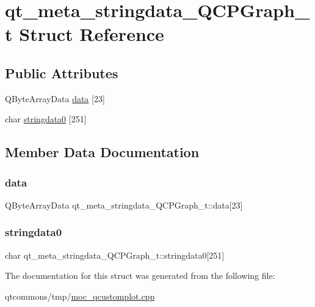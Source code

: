 \hypertarget{structqt__meta__stringdata___q_c_p_graph__t}{}\section{qt\+\_\+meta\+\_\+stringdata\+\_\+\+Q\+C\+P\+Graph\+\_\+t Struct Reference}
\label{structqt__meta__stringdata___q_c_p_graph__t}
\subsection*{Public Attributes}
\begin{DoxyCompactItemize}
\item 
Q\+Byte\+Array\+Data \mbox{\hyperlink{structqt__meta__stringdata___q_c_p_graph__t_af78bec72bfcd2280647dbc8a0f13efb4}{data}} \mbox{[}23\mbox{]}
\item 
char \mbox{\hyperlink{structqt__meta__stringdata___q_c_p_graph__t_a40cf507394e2a4d8b2cbcd563af62ad0}{stringdata0}} \mbox{[}251\mbox{]}
\end{DoxyCompactItemize}


\subsection{Member Data Documentation}
\mbox{\label{structqt__meta__stringdata___q_c_p_graph__t_af78bec72bfcd2280647dbc8a0f13efb4}} 
\subsubsection{\texorpdfstring{data}{data}}
{\footnotesize\ttfamily Q\+Byte\+Array\+Data qt\+\_\+meta\+\_\+stringdata\+\_\+\+Q\+C\+P\+Graph\+\_\+t\+::data\mbox{[}23\mbox{]}}

\mbox{\label{structqt__meta__stringdata___q_c_p_graph__t_a40cf507394e2a4d8b2cbcd563af62ad0}} 
\subsubsection{\texorpdfstring{stringdata0}{stringdata0}}
{\footnotesize\ttfamily char qt\+\_\+meta\+\_\+stringdata\+\_\+\+Q\+C\+P\+Graph\+\_\+t\+::stringdata0\mbox{[}251\mbox{]}}



The documentation for this struct was generated from the following file\+:\begin{DoxyCompactItemize}
\item 
qtcommons/tmp/\mbox{\hyperlink{moc__qcustomplot_8cpp}{moc\+\_\+qcustomplot.\+cpp}}\end{DoxyCompactItemize}

